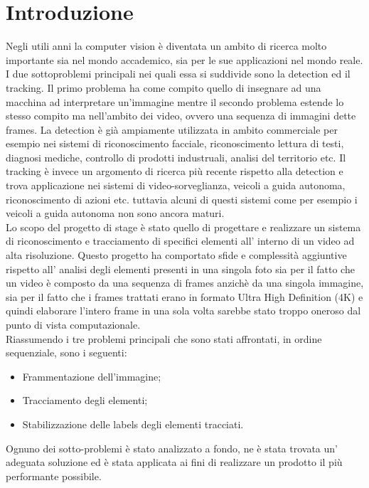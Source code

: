 \section{Introduzione}
Negli utili anni la computer vision è diventata un ambito di ricerca molto importante sia nel mondo accademico, sia per le sue applicazioni nel mondo reale. I due sottoproblemi principali nei quali essa si suddivide sono la detection ed il tracking. Il primo problema ha come compito quello di insegnare ad una macchina ad interpretare un'immagine mentre il secondo problema estende lo stesso compito ma nell'ambito dei video, ovvero una sequenza di immagini dette frames. La detection è già ampiamente utilizzata in ambito commerciale per esempio nei sistemi di riconoscimento facciale, riconoscimento lettura di testi, diagnosi mediche, controllo di prodotti industruali, analisi del territorio etc. Il tracking è invece un argomento di ricerca più recente rispetto alla detection e trova applicazione nei sistemi di video-sorveglianza, veicoli a guida autonoma, riconoscimento di azioni etc. tuttavia alcuni di questi sistemi come per esempio i veicoli a guida autonoma non sono ancora maturi.\\

Lo scopo del progetto di stage è stato quello di progettare e realizzare un sistema di riconoscimento e tracciamento di specifici elementi all' interno di un video ad alta risoluzione. Questo progetto ha comportato sfide e complessità aggiuntive rispetto all' analisi degli elementi presenti in una singola foto sia per il fatto che un video è composto da una sequenza di frames anzichè da una singola immagine, sia per il fatto che i frames trattati erano in formato Ultra High Definition (4K) e quindi elaborare l'intero frame in una sola volta sarebbe stato troppo oneroso dal punto di vista computazionale.\\

Riassumendo i tre problemi principali che sono stati affrontati, in ordine sequenziale, sono i seguenti:
\begin{itemize}
\item Frammentazione dell'immagine;
\item Tracciamento degli elementi;
\item Stabilizzazione delle labels degli elementi tracciati.
\end{itemize}
Ognuno dei sotto-problemi è stato analizzato a fondo, ne è stata trovata un' adeguata soluzione ed è stata applicata ai fini di realizzare un prodotto il più performante possibile.

